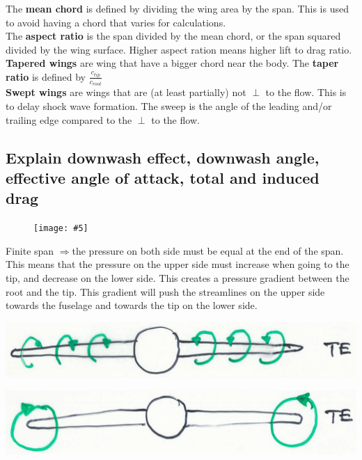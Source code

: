\documentclass[british,french,11pt, a4paper, openany]{article}
\newcommand{\wrapfig}[6]{%
	\begin{figure}%
		\vspace{-5mm}%
		\texttt{[image: \#5]}%
		\captionof{figure}{}%
		\label{#6}%
	\end{figure}%
}
\begin{document}
The \textbf{mean chord} is defined by dividing the wing area by the span. This is used to avoid having a chord that varies for calculations.\\
The \textbf{aspect ratio} is the span divided  by the mean chord, or the span squared divided by the wing surface. Higher aspect ration means higher lift to drag ratio.\\
\textbf{Tapered wings} are wing that have a bigger chord near the body. The \textbf{taper ratio} is defined by $\frac{c_{tip}}{c_{root}}$\\
\textbf{Swept wings} are wings that are (at least partially) not $\perp$ to the flow. This is to delay shock wave formation. The sweep is the angle of the leading and/or trailing edge compared to the $\perp$ to the flow.

\subsection{Explain downwash effect, downwash angle, effective angle of attack, total and induced drag}
\wrapfig{7}{l}{6.5}{0.1}{ch3/3}{fig:3.3}
Finite span $\Rightarrow$the pressure on both side must be equal at the end of the span. This means that the pressure on the upper side must increase when going to the tip, and decrease on the lower side. This creates a pressure gradient between the root and the tip. This gradient will push the streamlines on the upper side towards the fuselage and towards the tip on the lower side. 

\begin{center}
	\begin{minipage}{0.4\textwidth}
		\includegraphics[scale=0.1]{ch3/4}
		\label{fig:3.4}
	\end{minipage}
	\begin{minipage}{0.4\textwidth}
		\includegraphics[scale=0.1]{ch3/5}
		\label{fig:3.5}
	\end{minipage}
\end{center}
\end{document}
